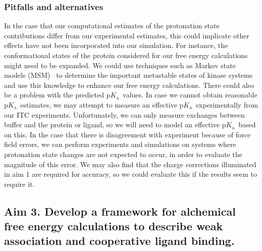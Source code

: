 \documentclass[10pt,final]{article}
\newcommand{\pKa}{p$K_\mathrm{a}$\ }
\begin{document}
\subsubsection*{Pitfalls and alternatives}
In the case that our computational estimates of the protonation state contributions differ from our experimental estimates, this could implicate other effects have not been incorporated into our simulation. 
%
For instance, the conformational states of the protein considered for our free energy calculations might need to be expanded.
%
We could use techniques such as Markov state models (MSM)~\autocite{Prinz2011a} to determine the important metastable states of kinase systems and use this knowledge to enhance our free energy calculations.
%
There could also be a problem with the predicted \pKa values.
%
In case we cannot obtain reasonable \pKa estimates, we may attempt to measure an effective \pKa experimentally from our ITC experiments.
%
Unfortunately, we can only measure exchanges between buffer and the protein or ligand, so we will need to model an effective \pKa based on this.
%
In the case that there is disagreement with experiment because of force field errors, we can perform experiments and simulations on systems where protonation state changes are not expected to occur, in order to evaluate the magnitude of this error.
%
We may also find that the charge corrections illuminated in aim 1 are required for accuracy, so we could evaluate this if the results seem to require it.

\subsection*{Aim 3. Develop a framework for alchemical free energy calculations to describe weak association and cooperative ligand binding.}
\end{document}
